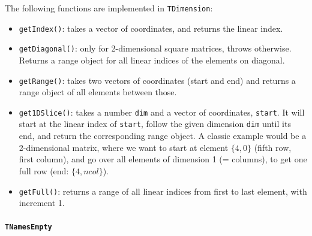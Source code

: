 \documentclass[a4paper,11pt]{article}
\newcommand{\class}[1]{\texttt{#1}}
\newcommand{\pubparam}[1]{\texttt{#1}}
\newcommand{\pubfunc}[1]{\texttt{#1()}}
\begin{document}
The following functions are implemented in \class{TDimension}:
\begin{itemize}
 \item \pubfunc{getIndex}: takes a vector of coordinates, and returns the linear index.
 \item \pubfunc{getDiagonal}: only for 2-dimensional square matrices, throws otherwise. Returns a range object for all linear indices of the elements on diagonal.
 \item \pubfunc{getRange}: takes two vectors of coordinates (start and end) and returns a range object of all elements between those.
 \item \pubfunc{get1DSlice}: takes a number \pubparam{dim} and a vector of coordinates, \pubparam{start}. It will start at the linear index of \pubparam{start}, follow the given dimension \pubparam{dim} until its end, and return the corresponding range object. A classic example would be a 2-dimensional matrix, where we want to start at element $\{4,0\}$ (fifth row, first column), and go over all elements of dimension 1 (= columns), to get one full row (end: $\{4,ncol\}$).
 \item \pubfunc{getFull}: returns a range of all linear indices from first to last element, with increment 1.
\end{itemize}

\paragraph{\class{TNamesEmpty}}
\end{document}
